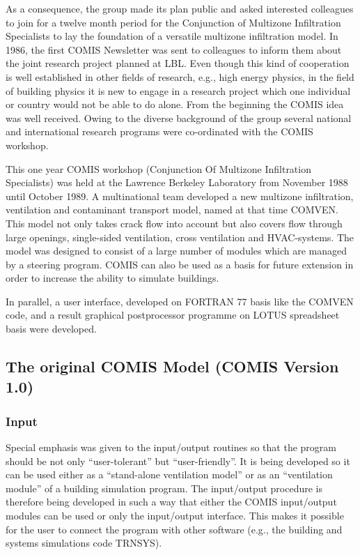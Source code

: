 \documentclass[10pt]{article}
\begin{document}
As a consequence, the group made its plan public and asked interested colleagues to join for a twelve month period for the Conjunction of Multizone Infiltration Specialists to lay the foundation of a versatile multizone infiltration model. In 1986, the first COMIS Newsletter was sent to colleagues to inform them about the joint research project planned at LBL. Even though this kind of cooperation is well established in other fields of research, e.g., high energy physics, in the field of building physics it is new to engage in a research project which one individual or country would not be able to do alone. From the beginning the COMIS idea was well received. Owing to the diverse background of the group several national and international research programs were co-ordinated with the COMIS workshop.

This one year COMIS workshop (Conjunction Of Multizone Infiltration Specialists) was held at the Lawrence Berkeley Laboratory from November 1988 until October 1989. A multinational team developed a new multizone infiltration, ventilation and contaminant transport model, named at that time COMVEN. This model not only takes crack flow into account but also covers flow through large openings, single-sided ventilation, cross ventilation and HVAC-systems. The model was designed to consist of a large number of modules which are managed by a steering program. COMIS can also be used as a basis for future extension in order to increase the ability to simulate buildings.

In parallel, a user interface, developed on FORTRAN 77 basis like the COMVEN code, and a result graphical postprocessor programme on LOTUS spreadsheet basis were developed.

\subsection{The original COMIS Model (COMIS Version 1.0)}

\subsubsection{Input}
Special emphasis was given to the input/output routines so that the program should be not only ``user-tolerant'' but ``user-friendly''. It is being developed so it can be used either as a ``stand-alone ventilation model'' or as an ``ventilation module'' of a building simulation program. The input/output procedure is therefore being developed in such a way that either the COMIS in­put/output modules can be used or only the input/output interface. This makes it possible for the user to connect the program with other software (e.g., the building and systems simulations code TRNSYS).
\end{document}
